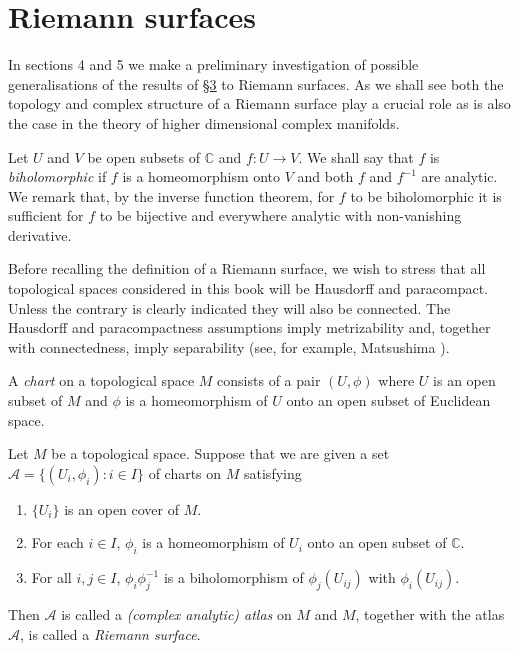 \section{Riemann surfaces}\label{sec:1:4}
In sections 4 and 5 we make a preliminary investigation of possible generalisations of the results of \hyperref[sec:1:3]{\S3} to Riemann surfaces. As we shall see both the topology and complex structure of a Riemann surface play a crucial role as is also the case in the theory of higher dimensional complex manifolds.

Let $U$ and $V$ be open subsets of $\mathbb C$ and $f:U\to V$. We shall say that $f$ is \emph{biholomorphic} if $f$ is a homeomorphism onto $V$ and both $f$ and $f^{-1}$ are analytic. We remark that, by the inverse function theorem, for $f$ to be biholomorphic it is sufficient for $f$ to be bijective and everywhere analytic with non-vanishing derivative.

Before recalling the definition of a Riemann surface, we wish to stress that all topological spaces considered in this book will be Hausdorff and paracompact. Unless the contrary is clearly indicated they will also be connected. The Hausdorff and paracompactness assumptions imply metrizability and, together with connectedness, imply separability (see, for example, Matsushima \cite{bib:I:matsushima-y:1}).

A \emph{chart} on a topological space $M$ consists of a pair $(U,\phi)$ where $U$ is an open subset of $M$ and $\phi$ is a homeomorphism of $U$ onto an open subset of Euclidean space.

 Let $M$ be a topological space. Suppose that we are given a set $\mathcal A=\{(U_i,\phi_i):i\in I\}$ of charts on $M$ satisfying
\begin{enumerate}
\item $\{U_i\}$ is an open cover of $M$.
\item For each $i\in I$, $\phi_i$ is a homeomorphism of $U_i$ onto an open subset of $\mathbb C$.
\item For all $i,j\in I$, $\phi_i\phi_j^{-1}$ is a biholomorphism of $\phi_j(U_{ij})$ with $\phi_i(U_{ij})$.
\end{enumerate}
Then $\mathcal A$ is called a \emph{(complex analytic) atlas} on $M$ and $M$, together with the atlas $\mathcal A$, is called a \emph{Riemann surface}.
